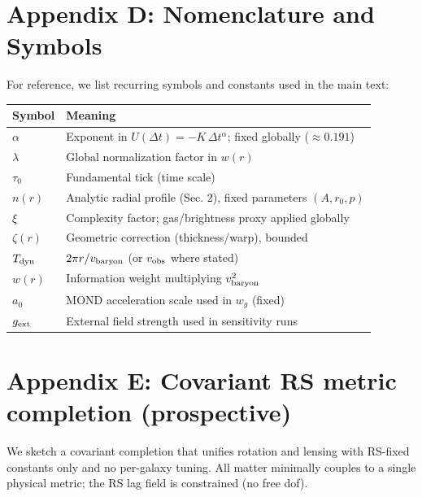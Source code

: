 \documentclass[12pt,a4paper]{article}
\begin{document}
\section*{Appendix D: Nomenclature and Symbols}
\noindent For reference, we list recurring symbols and constants used in the main text:
\begin{center}
\begin{tabular}{ll}
\toprule
Symbol & Meaning \\
\midrule
$\alpha$ & Exponent in $U(\Delta t)=-K\,\Delta t^{\alpha}$; fixed globally ($\approx0.191$) \\
$\lambda$ & Global normalization factor in $w(r)$ \\
$\tau_0$ & Fundamental tick (time scale) \\
$n(r)$ & Analytic radial profile (Sec. 2), fixed parameters $(A,r_0,p)$ \\
$\xi$ & Complexity factor; gas/brightness proxy applied globally \\
$\zeta(r)$ & Geometric correction (thickness/warp), bounded \\
$T_{\rm dyn}$ & $2\pi r/v_{\rm baryon}$ (or $v_{\rm obs}$ where stated) \\
$w(r)$ & Information weight multiplying $v_{\rm baryon}^2$ \\
$a_0$ & MOND acceleration scale used in $w_g$ (fixed) \\
$g_{\rm ext}$ & External field strength used in sensitivity runs \\
\bottomrule
\end{tabular}
\end{center}

\section*{Appendix E: Covariant RS metric completion (prospective)}
\noindent We sketch a covariant completion that unifies rotation and lensing with RS-fixed constants only and no per-galaxy tuning. All matter minimally couples to a single physical metric; the RS lag field is constrained (no free dof).
\end{document}
